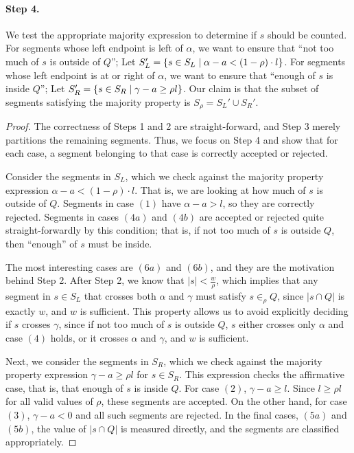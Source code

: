 \paragraph{Step 4.} We test the appropriate majority expression to determine if $s$ should be counted. For segments whose left endpoint is left of $\alpha$, we want to ensure that ``not too much of $s$ is outside of $Q$''; Let $S_L' = \{ s \in S_L \;|\; \alpha - a < (1 - \rho) \cdot l\}$. For segments whose left endpoint is at or right of $\alpha$, we want to ensure that ``enough of $s$ is inside $Q$''; Let $S_R' = \{ s \in S_R \;|\; \gamma - a \geq  \rho l \}$. Our claim is that the subset of segments satisfying the majority property is $S_\rho = S_L' \cup S_R'$. 

\begin{proof}
The correctness of Steps 1 and 2 are straight-forward, and Step 3 merely partitions the remaining segments. Thus, we focus on Step 4 and show that for each case, a segment belonging to that case is correctly accepted or rejected.

Consider the segments in $S_L$, which we check against the majority property expression $\alpha - a < (1 - \rho) \cdot l$. That is, we are looking at how much of $s$ is outside of $Q$. Segments in case $(1)$ have $\alpha - a > l$, so they are correctly rejected. Segments in cases $(4a)$ and $(4b)$ are accepted or rejected quite straight-forwardly by this condition; that is, if not too much of $s$ is outside $Q$, then ``enough'' of $s$ must be inside.  

The most interesting cases are $(6a)$ and $(6b)$, and they are the motivation behind Step 2.  After Step 2, we know that $|s| < \frac{w}{\rho}$, which implies that any segment in $s \in S_L$ that crosses both $\alpha$ and $\gamma$ must satisfy $s \in_\rho Q$, since $|s \cap Q|$ is exactly $w$, and $w$ is sufficient. This property allows us to avoid explicitly deciding if $s$ crosses $\gamma$, since if not too much of $s$ is outside $Q$, $s$ either crosses only $\alpha$ and case $(4)$ holds, or it crosses $\alpha$ and $\gamma$, and $w$ is sufficient.

Next, we consider the segments in $S_R$, which we check against the majority property expression $\gamma - a \geq  \rho l$ for $s \in S_R$. 
This expression checks the affirmative case, that is, that enough of $s$ is inside $Q$.
For case $(2)$, $\gamma - a \geq l$. 
Since $l \geq \rho l$ for all valid values of $\rho$, these segments are accepted.
On the other hand, for case $(3)$, $\gamma - a < 0$ and all such segments are rejected. 
In the final cases, $(5a)$ and $(5b)$, the value of $|s \cap Q|$ is measured directly, and the segments are classified appropriately.

\end{proof}


